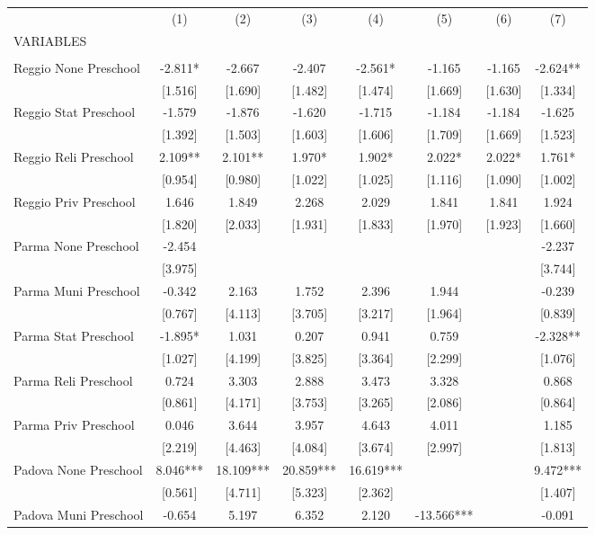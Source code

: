 \begin{tabular}{lccccccc} \hline
 & (1) & (2) & (3) & (4) & (5) & (6) & (7) \\
VARIABLES &  &  &  &  &  &  &  \\ \hline
 &  &  &  &  &  &  &  \\
Reggio None Preschool & -2.811* & -2.667 & -2.407 & -2.561* & -1.165 & -1.165 & -2.624** \\
 & [1.516] & [1.690] & [1.482] & [1.474] & [1.669] & [1.630] & [1.334] \\
Reggio Stat Preschool & -1.579 & -1.876 & -1.620 & -1.715 & -1.184 & -1.184 & -1.625 \\
 & [1.392] & [1.503] & [1.603] & [1.606] & [1.709] & [1.669] & [1.523] \\
Reggio Reli Preschool & 2.109** & 2.101** & 1.970* & 1.902* & 2.022* & 2.022* & 1.761* \\
 & [0.954] & [0.980] & [1.022] & [1.025] & [1.116] & [1.090] & [1.002] \\
Reggio Priv Preschool & 1.646 & 1.849 & 2.268 & 2.029 & 1.841 & 1.841 & 1.924 \\
 & [1.820] & [2.033] & [1.931] & [1.833] & [1.970] & [1.923] & [1.660] \\
Parma None Preschool & -2.454 &  &  &  &  &  & -2.237 \\
 & [3.975] &  &  &  &  &  & [3.744] \\
Parma Muni Preschool & -0.342 & 2.163 & 1.752 & 2.396 & 1.944 &  & -0.239 \\
 & [0.767] & [4.113] & [3.705] & [3.217] & [1.964] &  & [0.839] \\
Parma Stat Preschool & -1.895* & 1.031 & 0.207 & 0.941 & 0.759 &  & -2.328** \\
 & [1.027] & [4.199] & [3.825] & [3.364] & [2.299] &  & [1.076] \\
Parma Reli Preschool & 0.724 & 3.303 & 2.888 & 3.473 & 3.328 &  & 0.868 \\
 & [0.861] & [4.171] & [3.753] & [3.265] & [2.086] &  & [0.864] \\
Parma Priv Preschool & 0.046 & 3.644 & 3.957 & 4.643 & 4.011 &  & 1.185 \\
 & [2.219] & [4.463] & [4.084] & [3.674] & [2.997] &  & [1.813] \\
Padova None Preschool & 8.046*** & 18.109*** & 20.859*** & 16.619*** &  &  & 9.472*** \\
 & [0.561] & [4.711] & [5.323] & [2.362] &  &  & [1.407] \\
Padova Muni Preschool & -0.654 & 5.197 & 6.352 & 2.120 & -13.566*** &  & -0.091 \\

\end{tabular}
